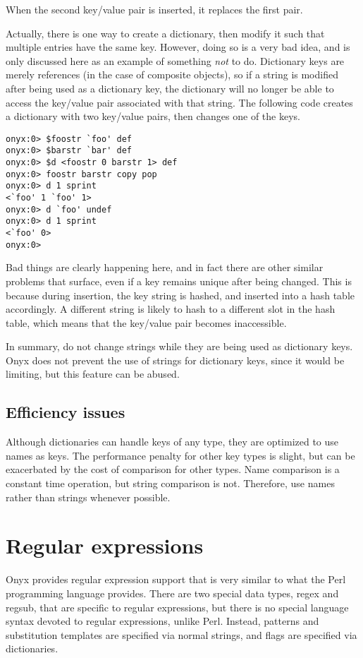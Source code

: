 When the second key/value pair is inserted, it replaces the first pair.

Actually, there is one way to create a dictionary, then modify it such that
multiple entries have the same key.  However, doing so is a very bad idea, and
is only discussed here as an example of something {\em not} to do.  Dictionary
keys are merely references (in the case of composite objects), so if a string is
modified after being used as a dictionary key, the dictionary will no longer be
able to access the key/value pair associated with that string.  The following
code creates a dictionary with two key/value pairs, then changes one of the
keys.

\begin{verbatim}
onyx:0> $foostr `foo' def
onyx:0> $barstr `bar' def
onyx:0> $d <foostr 0 barstr 1> def
onyx:0> foostr barstr copy pop
onyx:0> d 1 sprint
<`foo' 1 `foo' 1>
onyx:0> d `foo' undef
onyx:0> d 1 sprint
<`foo' 0>
onyx:0>
\end{verbatim}

Bad things are clearly happening here, and in fact there are other similar
problems that surface, even if a key remains unique after being changed.  This
is because during insertion, the key string is hashed, and inserted into a hash
table accordingly.  A different string is likely to hash to a different slot in
the hash table, which means that the key/value pair becomes inaccessible.

In summary, do not change strings while they are being used as dictionary keys.
Onyx does not prevent the use of strings for dictionary keys, since it would be
limiting, but this feature can be abused.

\subsection{Efficiency issues}

Although dictionaries can handle keys of any type, they are optimized to use
names as keys.  The performance penalty for other key types is slight, but can
be exacerbated by the cost of comparison for other types.  Name comparison is a
constant time operation, but string comparison is not.  Therefore, use names
rather than strings whenever possible.

\section{Regular expressions}
Onyx provides regular expression support that is very similar to what the Perl
programming language provides.  There are two special data types, regex and
regsub, that are specific to regular expressions, but there is no special
language syntax devoted to regular expressions, unlike Perl.  Instead, patterns
and substitution templates are specified via normal strings, and flags are
specified via dictionaries.

